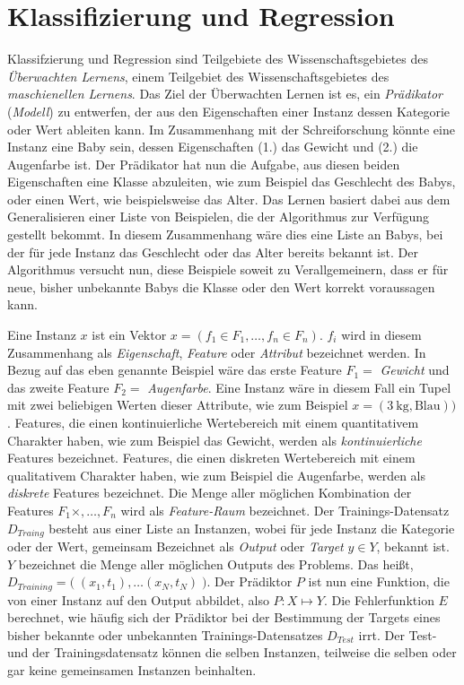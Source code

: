 \section{Klassifizierung und Regression}
\label{sec:learning}

Klassifzierung und Regression sind Teilgebiete des Wissenschaftsgebietes des \emph{Überwachten Lernens}, einem Teilgebiet des Wissenschaftsgebietes des \emph{maschienellen Lernens}. Das Ziel der Überwachten Lernen ist es, ein \emph{Prädikator} (\emph{Modell}) zu entwerfen, der aus den Eigenschaften einer Instanz dessen Kategorie oder Wert ableiten kann. Im Zusammenhang mit der Schreiforschung könnte eine Instanz eine Baby sein, dessen Eigenschaften (1.) das Gewicht und (2.) die Augenfarbe ist. Der Prädikator hat nun die Aufgabe, aus diesen beiden Eigenschaften eine Klasse abzuleiten, wie zum Beispiel das Geschlecht des Babys, oder einen Wert, wie beispielsweise das Alter. Das Lernen basiert dabei aus dem Generalisieren einer Liste von Beispielen, die der Algorithmus zur Verfügung gestellt bekommt. In diesem Zusammenhang wäre dies eine Liste an Babys, bei der für jede Instanz das Geschlecht oder das Alter bereits bekannt ist. Der Algorithmus versucht nun, diese Beispiele soweit zu Verallgemeinern, dass er für neue, bisher unbekannte Babys die Klasse oder den Wert korrekt voraussagen kann.\cite[S. 6 - 7]{machine_marsland}

Eine Instanz $x$ ist ein Vektor $x = ( f_1 \in F_1 , \ldots , f_n \in F_n )$. $f_i$ wird in diesem Zusammenhang als \emph{Eigenschaft}, \emph{Feature} oder \emph{Attribut} bezeichnet werden. In Bezug auf das eben genannte Beispiel wäre das erste Feature $F_1 = $ \emph{Gewicht} und das zweite Feature $F_2 = $ \emph{Augenfarbe}. Eine Instanz wäre in diesem Fall ein Tupel mit zwei beliebigen Werten dieser Attribute, wie zum Beispiel $x = ( \SI{3}{\kilogram}, \text{Blau}) )$. Features, die einen kontinuierliche Wertebereich mit einem quantitativem Charakter haben, wie zum Beispiel das Gewicht, werden als \emph{kontinuierliche} Features bezeichnet. Features, die einen diskreten Wertebereich mit einem qualitativem Charakter haben, wie zum Beispiel die Augenfarbe, werden als \emph{diskrete} Features bezeichnet.  Die Menge aller möglichen Kombination der Features $F_1 \times , \ldots , F_n$ wird als \emph{Feature-Raum} bezeichnet. Der Trainings-Datensatz $D_{Traing}$ besteht aus einer Liste an Instanzen, wobei für jede Instanz die Kategorie oder der Wert, gemeinsam Bezeichnet als \emph{Output} oder \emph{Target} $y \in Y$, bekannt ist. $Y$ bezeichnet die Menge aller möglichen Outputs des Problems. Das heißt, $D_{Training} = \big( \; (x_1, t_1), \ldots  (x_N, t_N) \; \big)$. Der Prädiktor $P$ ist nun eine Funktion, die von einer Instanz auf den Output abbildet, also $P: X \mapsto Y$. Die Fehlerfunktion $E$ berechnet, wie häufig sich der Prädiktor bei der Bestimmung der Targets eines bisher bekannte oder unbekannten Trainings-Datensatzes $D_{Test}$ irrt. Der Test- und der Trainingsdatensatz können die selben Instanzen, teilweise die selben oder gar keine gemeinsamen Instanzen beinhalten.\cite[S. 6 - 7, 18 - 19]{machine_marsland} \cite[S. 8 - 9]{learning_cart_dobra} 

